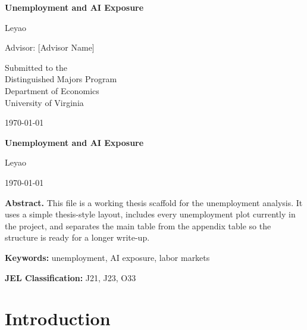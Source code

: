 \documentclass[12pt]{article}
\begin{document}
\begin{titlepage}
    \thispagestyle{empty}
    \begin{center}
        \vspace*{0.75in}
        {\LARGE\bfseries Unemployment and AI Exposure\par}
        \vspace{0.9in}
        {\Large Leyao\par}
        \vspace{0.35in}
        {\large Advisor: [Advisor Name]\par}
        \vspace{0.9in}
        {\large
            Submitted to the \\
            Distinguished Majors Program \\
            Department of Economics \\
            University of Virginia
        \par}
        \vspace{1in}
        {\large \today\par}
    \end{center}
\end{titlepage}

\newpage
\thispagestyle{empty}
\begin{center}
    {\Large\bfseries Unemployment and AI Exposure\par}
    \vspace{1.5em}
    {\large Leyao\par}
    \vspace{0.5em}
    {\normalsize \today\par}
\end{center}

\vspace{2em}
\noindent \textbf{Abstract.} This file is a working thesis scaffold for the unemployment analysis. It uses a simple thesis-style layout, includes every unemployment plot currently in the project, and separates the main table from the appendix table so the structure is ready for a longer write-up.

\par\vspace{2em}\noindent
\textbf{Keywords:} unemployment, AI exposure, labor markets
\par\noindent
\textbf{JEL Classification:} J21, J23, O33

\newpage

\section{Introduction}
\end{document}
